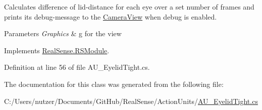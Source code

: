 Calculates difference of lid-\/distance for each eye over a set number of frames and prints its\textquotesingle{} debug-\/message to the \hyperlink{class_real_sense_1_1_camera_view}{Camera\+View} when debug is enabled. 
\begin{DoxyParams}{Parameters}
{\em Graphics} & g for the view \\
\hline
\end{DoxyParams}


Implements \hyperlink{class_real_sense_1_1_r_s_module_a2ec830b7932ee7c0077d473f81c73867}{Real\+Sense.\+R\+S\+Module}.



Definition at line 56 of file A\+U\+\_\+\+Eyelid\+Tight.\+cs.



The documentation for this class was generated from the following file\+:\begin{DoxyCompactItemize}
\item 
C\+:/\+Users/nutzer/\+Documents/\+Git\+Hub/\+Real\+Sense/\+Action\+Units/\hyperlink{_a_u___eyelid_tight_8cs}{A\+U\+\_\+\+Eyelid\+Tight.\+cs}\end{DoxyCompactItemize}
